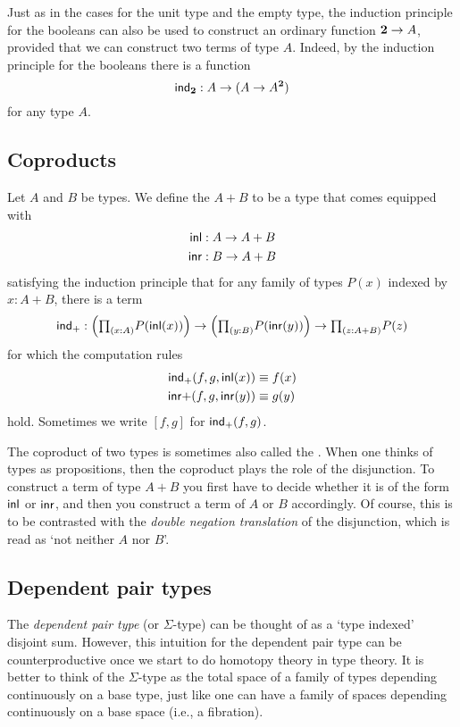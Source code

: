 Just as in the cases for the unit type and the empty type, the induction principle for the booleans can also be used to construct an ordinary function $\mathbf{2}\to A$, provided that we can construct two terms of type $A$. Indeed, by the induction principle for the booleans there is a function
\begin{equation*}
  \mathsf{ind}_{\mathbf{2}} : A \to (A\to A^\mathbf{2})
\end{equation*}
for any type $A$.

\subsection{Coproducts}
\begin{defn}
Let $A$ and $B$ be types. We define the  $A+B$ to be a type that comes equipped with
\begin{align*}
{\mathsf{inl}} & : A \to A+B \\
{\mathsf{inr}} & : B \to A+B
\end{align*}
satisfying the induction principle that for any family of types $P(x)$ indexed by $x:A+B$, there is a term
\begin{equation*}
\ind{+} : \Big(\prd{x:A}P(\inl(x))\Big)\to\Big(\prd{y:B}P(\inr(y))\Big)\to\prd{z:A+B}P(z)
\end{equation*}
for which the computation rules
\begin{align*}
\mathsf{ind}_{+}(f,g,{\mathsf{inl}}(x)) & \equiv f(x) \\
{\mathsf{inr}}{+}(f,g,{\mathsf{inr}}(y)) & \equiv g(y)
\end{align*}
hold. Sometimes we write $[f,g]$ for $\mathsf{ind}_{+}(f,g)$.
\end{defn}

The coproduct of two types is sometimes also called the .
When one thinks of types as propositions, then the coproduct plays the role of the disjunction.
To construct a term of type $A+B$ you first have to decide whether it is of the form ${\mathsf{inl}}$ or ${\mathsf{inr}}$, and then you construct a term of $A$ or $B$ accordingly. Of course, this is to be contrasted with the \emph{double negation translation} of the disjunction, which is read as `not neither $A$ nor $B$'. 

\subsection{Dependent pair types}
The \emph{dependent pair type} (or $\Sigma$-type) can be thought of as a `type indexed' disjoint sum.
However, this intuition for the dependent pair type can be counterproductive once we start to do homotopy theory in type theory.
It is better to think of the $\Sigma$-type as the total space of a family of types depending continuously on a base type, just like one can have a family of spaces depending continuously on a base space (i.e., a fibration).

